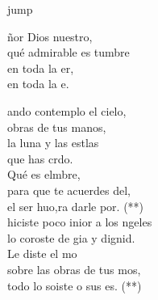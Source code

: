 \begin{cancion}jump\\
	\begin{chorus}%
		ñor Dios nuestro,\\
		qué admirable es tumbre\\
		en toda la er,\\
		en toda la e. \jump\\
	\end{chorus}%
	ando contemplo el cielo,\\
	\jump
obras de tus manos,\\
	la luna y las estlas\\
	que has crdo.\\
	\jump
	Qué es elmbre,\\
	para que te acuerdes del,\\
	el ser huo,ra darle por. (**)\\
	\jump
	 hiciste poco inior a los ngeles\\
	lo coroste de gia y dignid.\\
	Le diste el mo \\
	sobre las obras de tus mos,\\
	todo lo soiste o sus es. (**)\\
\end{cancion}%
